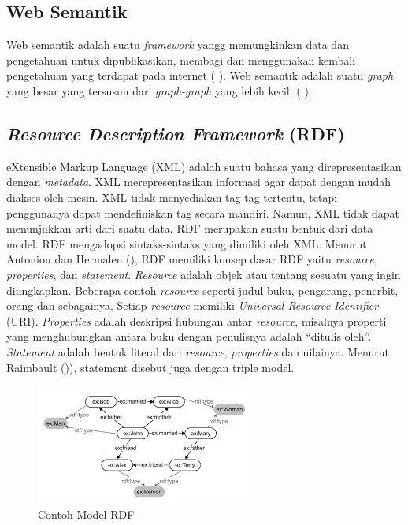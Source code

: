 \subsection*{Web Semantik}

Web semantik adalah suatu \textit{framework} yangg memungkinkan data dan pengetahuan untuk dipublikasikan, membagi dan menggunakan kembali pengetahuan yang terdapat pada internet (\citeauthor{DINGL2005} \cite*{DINGL2005}). Web semantik adalah suatu \textit{graph} yang besar yang tersusun dari \textit{graph-graph} yang lebih kecil. (\citeauthor{SEGARAB2009} \cite*{SEGARAB2009}).

\subsection*{\textit{Resource Description Framework} (RDF)}

eXtensible Markup Language (XML) adalah suatu bahasa yang direpresentasikan dengan \textit{metadata}. XML merepresentasikan informasi agar dapat dengan mudah diakses oleh mesin. XML tidak menyediakan tag-tag tertentu, tetapi penggunanya dapat mendefiniskan tag secara mandiri. Namun, XML tidak dapat menunjukkan arti dari suatu data. RDF merupakan suatu bentuk dari data model. RDF mengadopsi sintaks-sintaks yang dimiliki oleh XML. Menurut Antoniou dan Hermalen (\cite*{ANTONIOUG2008}), RDF memiliki konsep dasar RDF yaitu \textit{resource}, \textit{properties}, dan \textit{statement}. \textit{Resource} adalah objek atau tentang sesuatu yang ingin diungkapkan. Beberapa contoh \textit{resource} seperti judul buku, pengarang, penerbit, orang dan sebagainya. Setiap \textit{resource} memiliki \textit{Universal Resource
Identifier} (URI). \textit{Properties} adalah deskripsi hubungan antar \textit{resource}, misalnya properti yang menghubungkan antara buku dengan penulisnya adalah “ditulis oleh”. \textit{Statement} adalah bentuk literal dari \textit{resource}, \textit{properties} dan nilainya. Menurut Raimbault (\cite*{RAIMBAULT2010})), statement disebut juga dengan triple model.

\begin{figure}[h!] %
	\centering
	\includegraphics[width=200pt]{model_rdf_contoh_gb1.png}
	\caption{Contoh Model RDF}
	\label{fig:model_rdf}
\end{figure}

